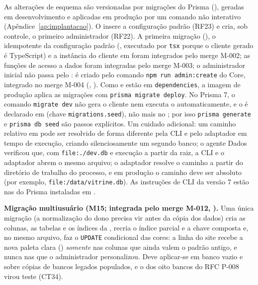 As alterações de esquema são versionadas por migrações do Prisma (), geradas em desenvolvimento e aplicadas em produção por um comando não interativo (Apêndice~\ref{ap:implantacao}). O  insere a configuração padrão (RF23) e cria, sob controle, o primeiro administrador (RF22). A primeira migração (), o  idempotente da configuração padrão (, executado por \texttt{tsx} porque o cliente gerado é TypeScript) e a instância do cliente em  foram integrados pelo merge M-002; as funções de acesso a dados foram integradas pelo merge M-003; o administrador inicial não passa pelo : é criado pelo comando \texttt{npm run admin:create} do Core, integrado no merge M-004 (, ). Como  e  estão em \texttt{dependencies}, a imagem de produção aplica as migrações com \texttt{prisma migrate deploy}. No Prisma 7, o comando \texttt{migrate dev} não gera o cliente nem executa o  automaticamente, e o  é declarado em  (chave \texttt{migrations.seed}), não mais no ; por isso \texttt{prisma generate} e \texttt{prisma db seed} são passos explícitos. Um cuidado adicional: um caminho relativo em  pode ser resolvido de forma diferente pela CLI e pelo adaptador em tempo de execução, criando silenciosamente um segundo banco; o agente Dados verificou que, com \texttt{file:./dev.db} e execução a partir da raiz, a CLI e o adaptador abrem o mesmo arquivo; o adaptador resolve o caminho a partir do diretório de trabalho do processo, e em produção o caminho deve ser absoluto (por exemplo, \texttt{file:/data/vitrine.db}). As instruções de CLI da versão 7 estão nas  do Prisma instaladas em .

\textbf{Migração multiusuário (M15; integrada pelo merge M-012, ).} Uma única migração (a normalização do dono precisa vir antes da cópia dos dados) cria as colunas, as tabelas e os índices da , recria o índice parcial e a chave composta e, no mesmo arquivo, faz o \texttt{UPDATE} condicional das cores: a linha do site recebe a nova paleta clara () \emph{somente} nas colunas que ainda valem o padrão antigo, e nunca nas que o administrador personalizou. Deve aplicar-se em banco vazio e sobre cópias de bancos legados populados, e o  dos oito bancos do RFC P-008 virou teste (CT34).

